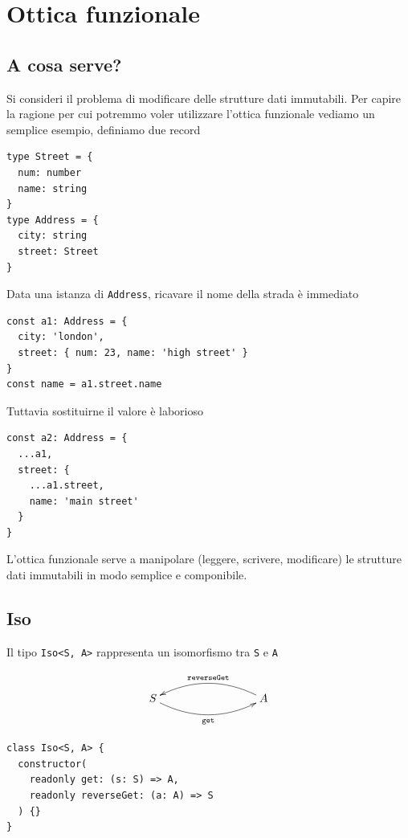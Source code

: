 \documentclass[12pt]{article}
\begin{document}
\newpage

\section{Ottica funzionale}

\subsection{A cosa serve?}

Si consideri il problema di modificare delle strutture dati immutabili.
Per capire la ragione per cui potremmo voler utilizzare l'ottica funzionale vediamo un semplice esempio, definiamo due record

\begin{verbatim}
type Street = {
  num: number
  name: string
}
type Address = {
  city: string
  street: Street
}
\end{verbatim}

Data una istanza di \texttt{Address}, ricavare il nome della strada è immediato

\begin{verbatim}
const a1: Address = {
  city: 'london',
  street: { num: 23, name: 'high street' }
}
const name = a1.street.name
\end{verbatim}

Tuttavia sostituirne il valore è laborioso

\begin{verbatim}
const a2: Address = {
  ...a1,
  street: {
    ...a1.street,
    name: 'main street'
  }
}
\end{verbatim}

L'ottica funzionale serve a manipolare (leggere, scrivere, modificare) le strutture dati immutabili in modo semplice e componibile.

\subsection{Iso}

Il tipo \texttt{Iso<S, A>} rappresenta un isomorfismo tra \texttt{S} e \texttt{A}

\[
\xymatrixrowsep{3cm}
\xymatrixcolsep{3cm}
\xymatrix{
  S \ar@/_0.5cm/[r]_{\texttt{get}} & A \ar@/_0.5cm/[l]_{\texttt{reverseGet}}
}
\]

\begin{verbatim}
class Iso<S, A> {
  constructor(
    readonly get: (s: S) => A,
    readonly reverseGet: (a: A) => S
  ) {}
}
\end{verbatim}
\end{document}
